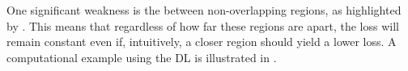 One significant weakness is the  between non-overlapping regions, as highlighted by \cite{9338261}. This means that regardless of how far these regions are apart, the loss will remain constant even if, intuitively, a closer region should yield a lower loss. A computational example using the \ac{DL} is illustrated in .
\begin{figure}[H]%
  \centering

\end{figure}
